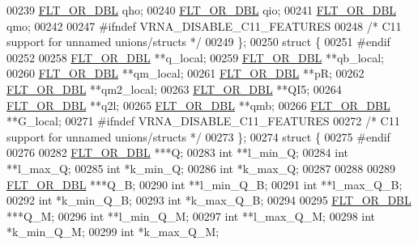 \begin{DoxyCode}
00239   \hyperlink{group__data__structures_ga31125aeace516926bf7f251f759b6126}{FLT\_OR\_DBL} qho;
00240   \hyperlink{group__data__structures_ga31125aeace516926bf7f251f759b6126}{FLT\_OR\_DBL} qio;
00241   \hyperlink{group__data__structures_ga31125aeace516926bf7f251f759b6126}{FLT\_OR\_DBL} qmo;
00242 
00247 \textcolor{preprocessor}{#ifndef VRNA\_DISABLE\_C11\_FEATURES}
00248   \textcolor{comment}{/* C11 support for unnamed unions/structs */}
00249 \};
00250 \textcolor{keyword}{struct }\{
00251 \textcolor{preprocessor}{#endif}
00252 
00258   \hyperlink{group__data__structures_ga31125aeace516926bf7f251f759b6126}{FLT\_OR\_DBL} **q\_local;
00259   \hyperlink{group__data__structures_ga31125aeace516926bf7f251f759b6126}{FLT\_OR\_DBL} **qb\_local;
00260   \hyperlink{group__data__structures_ga31125aeace516926bf7f251f759b6126}{FLT\_OR\_DBL} **qm\_local;
00261   \hyperlink{group__data__structures_ga31125aeace516926bf7f251f759b6126}{FLT\_OR\_DBL} **pR;
00262   \hyperlink{group__data__structures_ga31125aeace516926bf7f251f759b6126}{FLT\_OR\_DBL} **qm2\_local;
00263   \hyperlink{group__data__structures_ga31125aeace516926bf7f251f759b6126}{FLT\_OR\_DBL} **QI5;
00264   \hyperlink{group__data__structures_ga31125aeace516926bf7f251f759b6126}{FLT\_OR\_DBL} **q2l;
00265   \hyperlink{group__data__structures_ga31125aeace516926bf7f251f759b6126}{FLT\_OR\_DBL} **qmb;
00266   \hyperlink{group__data__structures_ga31125aeace516926bf7f251f759b6126}{FLT\_OR\_DBL} **G\_local;
00271 \textcolor{preprocessor}{#ifndef VRNA\_DISABLE\_C11\_FEATURES}
00272   \textcolor{comment}{/* C11 support for unnamed unions/structs */}
00273 \};
00274 \textcolor{keyword}{struct }\{
00275 \textcolor{preprocessor}{#endif}
00276 
00282   \hyperlink{group__data__structures_ga31125aeace516926bf7f251f759b6126}{FLT\_OR\_DBL} ***Q;
00283   \textcolor{keywordtype}{int} **l\_min\_Q;
00284   \textcolor{keywordtype}{int} **l\_max\_Q;
00285   \textcolor{keywordtype}{int} *k\_min\_Q;
00286   \textcolor{keywordtype}{int} *k\_max\_Q;
00287 
00288 
00289   \hyperlink{group__data__structures_ga31125aeace516926bf7f251f759b6126}{FLT\_OR\_DBL} ***Q\_B;
00290   \textcolor{keywordtype}{int} **l\_min\_Q\_B;
00291   \textcolor{keywordtype}{int} **l\_max\_Q\_B;
00292   \textcolor{keywordtype}{int} *k\_min\_Q\_B;
00293   \textcolor{keywordtype}{int} *k\_max\_Q\_B;
00294 
00295   \hyperlink{group__data__structures_ga31125aeace516926bf7f251f759b6126}{FLT\_OR\_DBL} ***Q\_M;
00296   \textcolor{keywordtype}{int} **l\_min\_Q\_M;
00297   \textcolor{keywordtype}{int} **l\_max\_Q\_M;
00298   \textcolor{keywordtype}{int} *k\_min\_Q\_M;
00299   \textcolor{keywordtype}{int} *k\_max\_Q\_M;

\end{DoxyCode}

